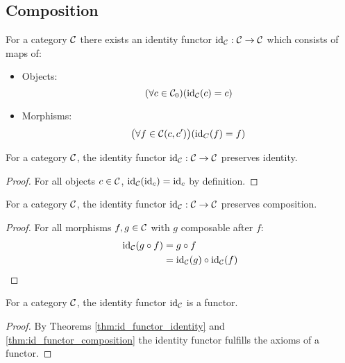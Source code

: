 \subsection{Composition}
\begin{definition} For a category $\mathcal{C}$ there exists an identity
  functor $\mathrm{id}_{\mathcal{C}}: \mathcal{C} \to \mathcal{C}$ which consists of maps of:
  \parencite{adamek_herrlich_strecker:joy_cats}
  \begin{itemize}
    \item Objects:
      \[(\forall c \in \mathcal{C}_0)
        (\mathrm{id}_{\mathcal{C}}(c) = c)\]
    \item Morphisms:
      \[\big(\forall f \in \mathcal{C}(c, c')\big)
        (\mathrm{id}_C(f) = f)\]
  \end{itemize}
\end{definition}

\begin{theorem}
  For a category $\mathcal{C}$, the identity functor $\mathrm{id}_{\mathcal{C}}: \mathcal{C} \to \mathcal{C}$ preserves
  identity.

  \begin{proof}
    For all objects $c\in \mathcal{C}$, $\mathrm{id}_{\mathcal{C}}(\mathrm{id}_c) = \mathrm{id}_c$ by definition.
  \end{proof}
\end{theorem}

\begin{theorem}
  For a category $\mathcal{C}$, the identity functor $\mathrm{id}_{\mathcal{C}}: \mathcal{C} \to \mathcal{C}$ preserves
  composition.

  \begin{proof}
    For all morphisms $f,g\in \mathcal{C}$ with $g$ composable after $f$:
    \[
      \begin{aligned}
        \mathrm{id}_{\mathcal{C}}(g\circ f)
        &= g\circ f\\
        &= \mathrm{id}_{\mathcal{C}}(g) \circ \mathrm{id}_{\mathcal{C}}(f)
      \end{aligned}
    \]
  \end{proof}
\end{theorem}

\begin{theorem}[$\id_\C$ is a Functor]
  For a category $\mathcal{C}$, the identity functor $\id_\C$ is a functor.

  \begin{proof}
    By Theorems \ref{thm:id_functor_identity} and
    \ref{thm:id_functor_composition} the identity functor fulfills the axioms of
    a functor.
  \end{proof}
\end{theorem}

